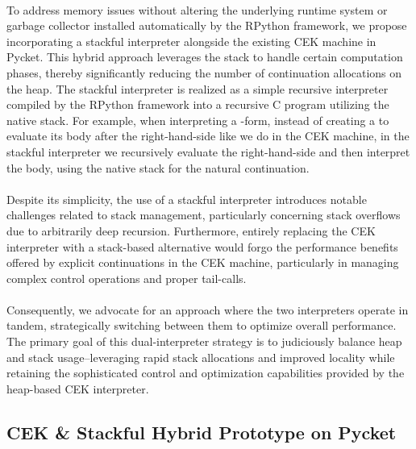     \paragraph{}%
      To address memory issues without altering the underlying runtime system or garbage collector installed automatically by the RPython framework, we propose incorporating a stackful interpreter alongside the existing CEK machine in Pycket. This hybrid approach leverages the stack to handle certain computation phases, thereby significantly reducing the number of continuation allocations on the heap. The stackful interpreter is realized as a simple recursive interpreter compiled by the RPython framework into a recursive C program utilizing the native stack. For example, when interpreting a -form, instead of creating a  to evaluate its body after the right-hand-side like we do in the CEK machine, in the stackful interpreter we recursively evaluate the right-hand-side and then interpret the body, using the native stack for the natural continuation.

    \paragraph{}%
      Despite its simplicity, the use of a stackful interpreter introduces notable challenges related to stack management, particularly concerning stack overflows due to arbitrarily deep recursion. Furthermore, entirely replacing the CEK interpreter with a stack-based alternative would forgo the performance benefits offered by explicit continuations in the CEK machine, particularly in managing complex control operations and proper tail-calls.

    \paragraph{}%
      Consequently, we advocate for an approach where the two interpreters operate in tandem, strategically switching between them to optimize overall performance. The primary goal of this dual-interpreter strategy is to judiciously balance heap and stack usage--leveraging rapid stack allocations and improved locality while retaining the sophisticated control and optimization capabilities provided by the heap-based CEK interpreter.

    \subsection{CEK \& Stackful Hybrid Prototype on Pycket}

